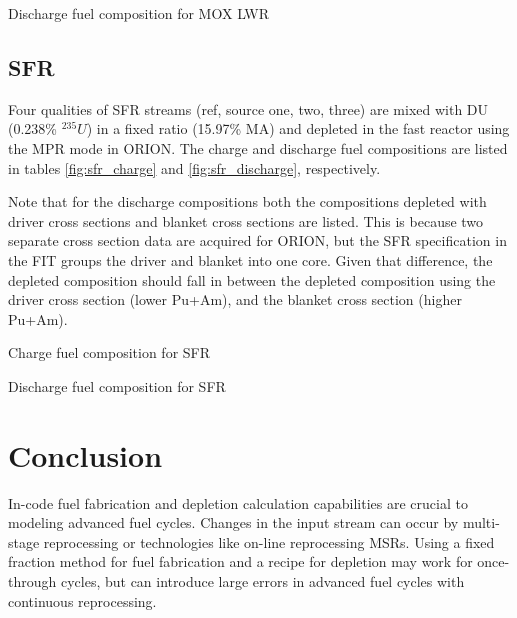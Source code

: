 \documentclass{article}
\begin{document}
\begin{table}[h]
    \centering
    
    \caption{Discharge fuel composition for \gls{MOX} \gls{LWR}}
    \label{fig:lwr_discharge}
\end{table}

\FloatBarrier

\subsection{\gls{SFR}}
Four qualities of \gls{SFR} streams (ref, source one, two, three) are mixed with
\gls{DU} (0.238\% $^{235}U$) in a fixed ratio (15.97\% \gls{MA}) and depleted in the 
fast reactor using the MPR mode in ORION. The charge and discharge fuel compositions are 
listed in tables \ref{fig:sfr_charge} and \ref{fig:sfr_discharge}, respectively.

Note that for the discharge compositions both the compositions depleted with driver
cross sections and blanket cross sections are listed. This is because two separate
cross section data are acquired for ORION, but the \gls{SFR} specification in the
FIT groups the driver and blanket into one core. Given that difference, the depleted
composition should fall in between the depleted composition using the driver cross section (lower Pu+Am),
and the blanket cross section (higher Pu+Am).

\begin{table}[h]
    \centering
    
    \caption{Charge fuel composition for \gls{SFR}}
    \label{fig:sfr_charge}
\end{table}

\begin{table}[h]
    \centering
    \resizebox{\textwidth}{!}{
    }
    \caption{Discharge fuel composition for \gls{SFR}}
    \label{fig:sfr_discharge}
\end{table}

\FloatBarrier

\section{Conclusion}
In-code fuel fabrication and depletion calculation capabilities are crucial
to modeling advanced fuel cycles.
Changes in the input stream can occur by multi-stage reprocessing or
technologies like on-line reprocessing \glspl{MSR}. Using a fixed fraction method
for fuel fabrication and a recipe for depletion may work for once-through cycles,
but can introduce large errors in advanced fuel cycles with continuous reprocessing.
\end{document}
